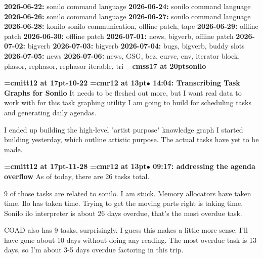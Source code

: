{\noindent \bf 2026-06-22:} sonilo command language\smallskip
{\noindent \bf 2026-06-24:} sonilo command language\smallskip
{\noindent \bf 2026-06-26:} sonilo command language\smallskip
{\noindent \bf 2026-06-27:} sonilo command language\smallskip
{\noindent \bf 2026-06-28:} konilo sonilo communication, offline patch, tape\smallskip
{\noindent \bf 2026-06-29:} offline patch\smallskip
{\noindent \bf 2026-06-30:} offline patch\smallskip
{\noindent \bf 2026-07-01:} news, bigverb, offline patch\smallskip
{\noindent \bf 2026-07-02:} bigverb\smallskip
{\noindent \bf 2026-07-03:} bigverb\smallskip
{\noindent \bf 2026-07-04:} bugs, bigverb, buddy slots\smallskip
{\noindent \bf 2026-07-05:} news\smallskip
{\noindent \bf 2026-07-06:} news, GSG, bez, curve, env, iterator block, phasor, rephasor, rephasor iterable, tri\smallskip
\vfill \break
{}
{\medskip\noindent\bf\font\titlefont=cmss17 at 20pt\titlefont sonilo}\medskip

{\medskip\noindent\bf\font\titlefont=cmitt12 at 17pt-10-22}\medskip
{\smallskip\noindent\bf\font\titlefont=cmr12 at 13pt\titlefont $\bullet$ 14:04: Transcribing Task Graphs for Sonilo}\smallskip
It needs to be fleshed out more, but I want real data to work with for this task graphing utility I am going to build for scheduling tasks and generating daily agendas.
\par

I ended up building the high-level "artist purpose" knowledge graph I started building yesterday, which outline artistic purpose. The actual tasks have yet to be made.
\par

{\medskip\noindent\bf\font\titlefont=cmitt12 at 17pt-11-28}\medskip
{\smallskip\noindent\bf\font\titlefont=cmr12 at 13pt\titlefont $\bullet$ 09:17: addressing the agenda overflow}\smallskip
As of today, there are 26 tasks total.
\par

9 of those tasks are related to sonilo. I am stuck. Memory allocators have taken time. Ilo has taken time. Trying to get the moving parts right is taking time. Sonilo ilo interpreter is about 26 days overdue, that's the most overdue task.
\par

COAD also has 9 tasks, surprisingly. I guess this makes a little more sense. I'll have gone about 10 days without doing any reading. The most overdue task is 13 days, so I'm about 3-5 days overdue factoring in this trip.
\par


